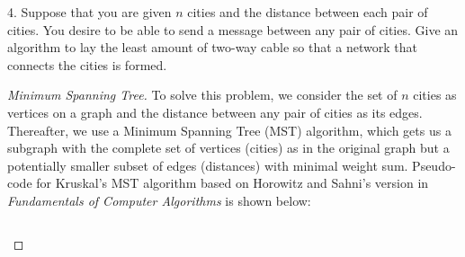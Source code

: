 \documentclass{scrartcl}
\begin{document}
\begin{flushleft}
    \newpage
    4. Suppose that you are given $n$ cities and the distance between each pair of cities. You
    desire to be able to send a message between any pair of cities. Give an algorithm to lay the
    least amount of two-way cable so that a network that connects the cities is formed.
    \begin{proof}[Minimum Spanning Tree]\let\qed\relax
        To solve this problem, we consider the set of $n$ cities as vertices on a graph and the
        distance between any pair of cities as its edges. Thereafter, we use a Minimum Spanning Tree
        (MST) algorithm, which gets us a subgraph with the complete set of vertices (cities) as in
        the original graph but a potentially smaller subset of edges (distances) with minimal weight
        sum. Pseudo-code for Kruskal's MST algorithm based on Horowitz and Sahni's version in
        \textit{Fundamentals of Computer Algorithms} is shown below:
\begin{verbatim}
\end{verbatim}
    \end{proof}

\end{flushleft}
\end{document}
